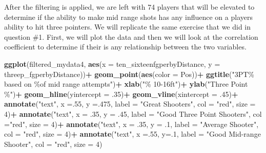 \documentclass[
]{article}
\newenvironment{Shaded}{\begin{snugshade}}{\end{snugshade}}
\newcommand{\AttributeTok}[1]{\textcolor[rgb]{0.13,0.29,0.53}{#1}}
\newcommand{\DecValTok}[1]{\textcolor[rgb]{0.00,0.00,0.81}{#1}}
\newcommand{\FunctionTok}[1]{\textcolor[rgb]{0.13,0.29,0.53}{\textbf{#1}}}
\newcommand{\NormalTok}[1]{#1}
\newcommand{\SpecialCharTok}[1]{\textcolor[rgb]{0.81,0.36,0.00}{\textbf{#1}}}
\newcommand{\StringTok}[1]{\textcolor[rgb]{0.31,0.60,0.02}{#1}}
\begin{document}
After the filtering is applied, we are left with 74 players that will be
elevated to determine if the ability to make mid range shots has any
influence on a players ability to hit three pointers. We will replicate
the same exercise that we did in question \#1. First, we will plot the
data and then we will look at the correlation coefficient to determine
if their is any relationship between the two variables.

\begin{Shaded}
\begin{Highlighting}[]
\FunctionTok{ggplot}\NormalTok{(filtered\_mydata4, }\FunctionTok{aes}\NormalTok{(}\AttributeTok{x =}\NormalTok{ ten\_sixteenfgperbyDistance, }\AttributeTok{y =}\NormalTok{ threep\_fgperbyDistance))}\SpecialCharTok{+}
  \FunctionTok{geom\_point}\NormalTok{(}\FunctionTok{aes}\NormalTok{(}\AttributeTok{color =}\NormalTok{ Pos))}\SpecialCharTok{+}
  \FunctionTok{ggtitle}\NormalTok{(}\StringTok{"3PT\% based on \%of mid range attempts"}\NormalTok{)}\SpecialCharTok{+}
  \FunctionTok{xlab}\NormalTok{(}\StringTok{"\% 10{-}16ft"}\NormalTok{)}\SpecialCharTok{+}
  \FunctionTok{ylab}\NormalTok{(}\StringTok{"Three Point \%"}\NormalTok{)}\SpecialCharTok{+}
  \FunctionTok{geom\_hline}\NormalTok{(}\AttributeTok{yintercept =}\NormalTok{ .}\DecValTok{35}\NormalTok{)}\SpecialCharTok{+}
  \FunctionTok{geom\_vline}\NormalTok{(}\AttributeTok{xintercept =}\NormalTok{ .}\DecValTok{45}\NormalTok{)}\SpecialCharTok{+}
  \FunctionTok{annotate}\NormalTok{(}\StringTok{"text"}\NormalTok{, }\AttributeTok{x =}\NormalTok{.}\DecValTok{55}\NormalTok{, }\AttributeTok{y =}\NormalTok{.}\DecValTok{475}\NormalTok{, }\AttributeTok{label =} \StringTok{"Great Shooters"}\NormalTok{, }\AttributeTok{col =} \StringTok{"red"}\NormalTok{, }\AttributeTok{size =} \DecValTok{4}\NormalTok{)}\SpecialCharTok{+}
  \FunctionTok{annotate}\NormalTok{(}\StringTok{"text"}\NormalTok{, }\AttributeTok{x =}\NormalTok{ .}\DecValTok{35}\NormalTok{, }\AttributeTok{y =}\NormalTok{ .}\DecValTok{45}\NormalTok{, }\AttributeTok{label =} \StringTok{"Good Three Point Shooters"}\NormalTok{, }\AttributeTok{col =}\StringTok{"red"}\NormalTok{, }\AttributeTok{size =} \DecValTok{4}\NormalTok{)}\SpecialCharTok{+}
  \FunctionTok{annotate}\NormalTok{(}\StringTok{"text"}\NormalTok{, }\AttributeTok{x =}\NormalTok{ .}\DecValTok{35}\NormalTok{, }\AttributeTok{y =}\NormalTok{ .}\DecValTok{1}\NormalTok{, }\AttributeTok{label =} \StringTok{"Average Shooter"}\NormalTok{, }\AttributeTok{col  =} \StringTok{"red"}\NormalTok{, }\AttributeTok{size =} \DecValTok{4}\NormalTok{)}\SpecialCharTok{+}
  \FunctionTok{annotate}\NormalTok{(}\StringTok{"text"}\NormalTok{, }\AttributeTok{x =}\NormalTok{.}\DecValTok{55}\NormalTok{, }\AttributeTok{y=}\NormalTok{.}\DecValTok{1}\NormalTok{, }\AttributeTok{label =} \StringTok{"Good Mid{-}range Shooter"}\NormalTok{, }\AttributeTok{col =} \StringTok{"red"}\NormalTok{, }\AttributeTok{size  =} \DecValTok{4}\NormalTok{)}
\end{Highlighting}
\end{Shaded}
\end{document}
